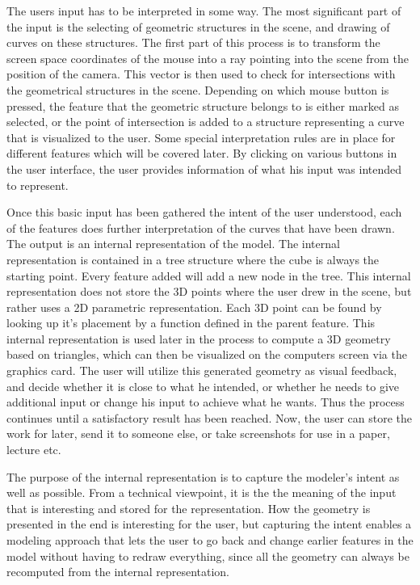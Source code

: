 \documentclass[a4paper,12pt]{report}
\begin{document}
The users input has to be interpreted in some way. The most significant part of the input is the selecting of geometric structures in the scene, and drawing of curves on these structures. The first part of this process is to transform the screen space coordinates of the mouse into a ray pointing into the scene from the position of the camera. This vector is then used to check for intersections with the geometrical structures in the scene. Depending on which mouse button is pressed, the feature that the geometric structure belongs to is either marked as selected, or the point of intersection is added to a structure representing a curve that is visualized to the user. Some special interpretation rules are in place for different features which will be covered later. By clicking on various buttons in the user interface, the user provides information of what his input was intended to represent.

Once this basic input has been gathered the intent of the user understood, each of the features does further interpretation of the curves that have been drawn. The output is an internal representation of the model. The internal representation is contained in a tree structure where the cube is always the starting point.  Every feature added will add a new node in the tree. This internal representation does not store the 3D points where the user drew in the scene, but rather uses a 2D parametric representation. Each 3D point can be found by looking up it's placement by a function defined in the parent feature. This internal representation is used later in the process to compute a 3D geometry based on triangles, which can then be visualized on the computers screen via the graphics card. The user will utilize this generated geometry as visual feedback, and decide whether it is close to what he intended, or whether he needs to give additional input or change his input to achieve what he wants. Thus the process continues until a satisfactory result has been reached. Now, the user can store the work for later, send it to someone else, or take screenshots for use in a paper, lecture etc.




The purpose of the internal representation is to capture the modeler's intent as well as possible. From a technical viewpoint, it is the the meaning of the input that is interesting and stored for the representation. How the geometry is presented in the end is interesting for the user, but capturing the intent enables a modeling approach that lets the user to go back and change earlier features in the model without having to redraw everything, since all the geometry can always be recomputed from the internal representation.
\end{document}
